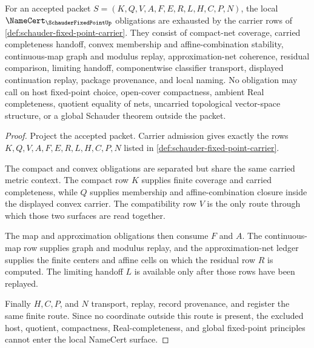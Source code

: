 \begin{theorem}
\label{thm:schauder-fixed-point-namecert-obligations}
For an accepted packet $S=(K,Q,V,A,F,E,R,L,H,C,P,N)$, the local $\NameCert_{\SchauderFixedPointUp}$ obligations are exhausted by the carrier rows of \autoref{def:schauder-fixed-point-carrier}. They consist of compact-net coverage, carried completeness handoff, convex membership and affine-combination stability, continuous-map graph and modulus replay, approximation-net coherence, residual comparison, limiting handoff, componentwise classifier transport, displayed continuation replay, package provenance, and local naming. No obligation may call on host fixed-point choice, open-cover compactness, ambient Real completeness, quotient equality of nets, uncarried topological vector-space structure, or a global Schauder theorem outside the packet.
\end{theorem}
\begin{proof}
Project the accepted packet. Carrier admission gives exactly the rows
$K,Q,V,A,F,E,R,L,H,C,P,N$ listed in
\autoref{def:schauder-fixed-point-carrier}.

The compact and convex obligations are separated but share the same carried
metric context. The compact row $K$ supplies finite coverage and carried
completeness, while $Q$ supplies membership and affine-combination closure
inside the displayed convex carrier. The compatibility row $V$ is the only
route through which those two surfaces are read together.

The map and approximation obligations then consume $F$ and $A$. The
continuous-map row supplies graph and modulus replay, and the approximation-net
ledger supplies the finite centers and affine cells on which the residual row
$R$ is computed. The limiting handoff $L$ is available only after those rows
have been replayed.

Finally $H,C,P$, and $N$ transport, replay, record provenance, and register the
same finite route. Since no coordinate outside this route is present, the
excluded host, quotient, compactness, Real-completeness, and global fixed-point
principles cannot enter the local NameCert surface.
\end{proof}

